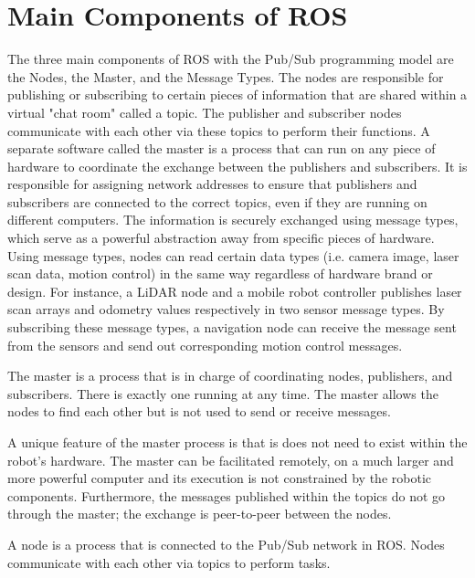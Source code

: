 \documentclass[twoside]{article}
\begin{document}
\section{Main Components of ROS} \label{main_component}\label{sec:maincomponent}
The three main components of ROS with the Pub/Sub programming model are the Nodes, the Master, and the Message Types. The nodes are responsible for publishing or subscribing to certain pieces of information that are shared within a virtual "chat room" called a topic. The publisher and subscriber nodes communicate with each other via these topics to perform their functions. A separate software called the master is a process that can run on any piece of hardware to coordinate the exchange between the publishers and subscribers. It is responsible for assigning network addresses to ensure that publishers and subscribers are connected to the correct topics, even if they are running on different computers. The information is securely exchanged using message types, which serve as a powerful abstraction away from specific pieces of hardware. Using message types, nodes can read certain data types (i.e. camera image, laser scan data, motion control) in the same way regardless of hardware brand or design. For instance, a LiDAR node and a mobile robot controller publishes laser scan arrays and odometry values respectively in two sensor message types. By subscribing these message types, a navigation node can receive the message sent from the sensors and send out corresponding motion control messages. 

\begin{frm-def}[Master]
The master is a process that is in charge of coordinating nodes, publishers, and subscribers. There is exactly one running at any time. The master allows the nodes to find each other but is not used to send or receive messages.
\end{frm-def}

A unique feature of the master process is that is does not need to exist within the robot's hardware. The master can be facilitated remotely, on a much larger and more powerful computer and its execution is not constrained by the robotic components. Furthermore, the messages published within the topics do not go through the master; the exchange is peer-to-peer between the nodes.\\ %

\begin{frm-def}[Node]
A node is a process that is connected to the Pub/Sub network in ROS. Nodes communicate with each other via topics to perform tasks.
\end{frm-def}
\end{document}
